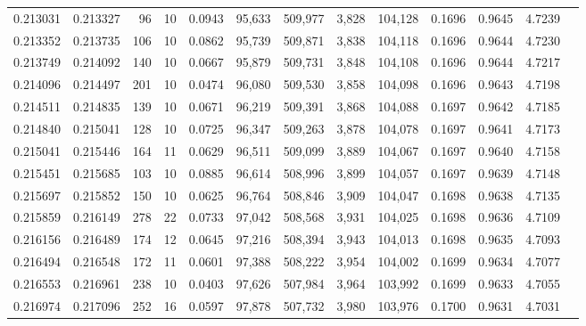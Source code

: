\begin{tabular}{rrrrrrrrrrrrr}
0.213031 & 0.213327 &    96 &  10 &                                     0.0943 &  95,633 & 509,977 &   3,828 & 104,128 & 0.1696 & 0.9645 & 4.7239 \\
0.213352 & 0.213735 &   106 &  10 &                                     0.0862 &  95,739 & 509,871 &   3,838 & 104,118 & 0.1696 & 0.9644 & 4.7230 \\
0.213749 & 0.214092 &   140 &  10 &                                     0.0667 &  95,879 & 509,731 &   3,848 & 104,108 & 0.1696 & 0.9644 & 4.7217 \\
0.214096 & 0.214497 &   201 &  10 &                                     0.0474 &  96,080 & 509,530 &   3,858 & 104,098 & 0.1696 & 0.9643 & 4.7198 \\
0.214511 & 0.214835 &   139 &  10 &                                     0.0671 &  96,219 & 509,391 &   3,868 & 104,088 & 0.1697 & 0.9642 & 4.7185 \\
0.214840 & 0.215041 &   128 &  10 &                                     0.0725 &  96,347 & 509,263 &   3,878 & 104,078 & 0.1697 & 0.9641 & 4.7173 \\
0.215041 & 0.215446 &   164 &  11 &                                     0.0629 &  96,511 & 509,099 &   3,889 & 104,067 & 0.1697 & 0.9640 & 4.7158 \\
0.215451 & 0.215685 &   103 &  10 &                                     0.0885 &  96,614 & 508,996 &   3,899 & 104,057 & 0.1697 & 0.9639 & 4.7148 \\
0.215697 & 0.215852 &   150 &  10 &                                     0.0625 &  96,764 & 508,846 &   3,909 & 104,047 & 0.1698 & 0.9638 & 4.7135 \\
0.215859 & 0.216149 &   278 &  22 &                                     0.0733 &  97,042 & 508,568 &   3,931 & 104,025 & 0.1698 & 0.9636 & 4.7109 \\
0.216156 & 0.216489 &   174 &  12 &                                     0.0645 &  97,216 & 508,394 &   3,943 & 104,013 & 0.1698 & 0.9635 & 4.7093 \\
0.216494 & 0.216548 &   172 &  11 &                                     0.0601 &  97,388 & 508,222 &   3,954 & 104,002 & 0.1699 & 0.9634 & 4.7077 \\
0.216553 & 0.216961 &   238 &  10 &                                     0.0403 &  97,626 & 507,984 &   3,964 & 103,992 & 0.1699 & 0.9633 & 4.7055 \\
0.216974 & 0.217096 &   252 &  16 &                                     0.0597 &  97,878 & 507,732 &   3,980 & 103,976 & 0.1700 & 0.9631 & 4.7031 \\

\end{tabular}
